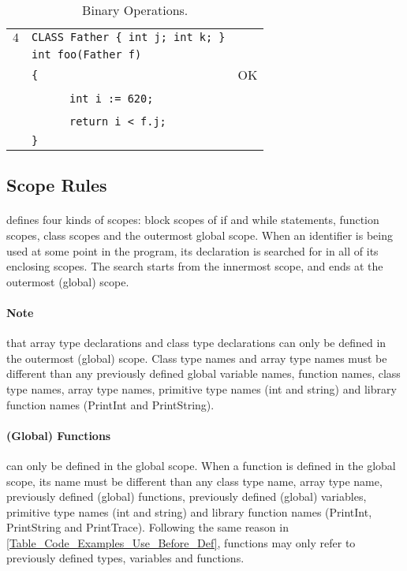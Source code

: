 \documentclass{article}
\begin{document}
\begin{table}[h]
\begin{tabular}{|l|l|l|}
\hline
 $4$ & \verb"CLASS Father { int j; int k; }" &    \\
     & \verb"int foo(Father f)"              &    \\
     & \verb"{"                              & OK \\
     & ~ ~ ~ ~\verb"int i := 620;"           &    \\
     & ~ ~ ~ ~\verb"return i < f.j;"         &    \\
     & \verb"}"                              &    \\
\hline
\end{tabular}
\caption{Binary Operations.
\label{Table_Code_Examples_Binary_Operations}}
\end{table}
\newpage
\subsection{Scope Rules}
\label{subsection_Scope_Rules}
\paragraph{\plname} defines four kinds of scopes:
block scopes of if and while statements,
function scopes,
class scopes and
the outermost global scope.
When an identifier is being used at some point in the program,
its declaration is searched for in all of its enclosing scopes.
The search starts from the innermost scope, 
and ends at the outermost (global) scope.
\paragraph{Note} that array type declarations and
class type declarations can only be defined
in the outermost (global) scope.
Class type names and array type names must be different than any
previously defined global variable names, function names, class type names,
array type names, primitive type names (int and string) and library function names
(PrintInt and PrintString).
\paragraph{(Global) Functions} can only be defined in the global scope.
When a function is defined in the global scope, its name must be different than
any class type name, array type name, previously defined (global) functions,
previously defined (global) variables,
primitive type names (int and string) and library function names (PrintInt, PrintString and PrintTrace).
Following the same reason in \ref{Table_Code_Examples_Use_Before_Def},
functions may only refer to previously defined types, variables and functions.
\end{document}
